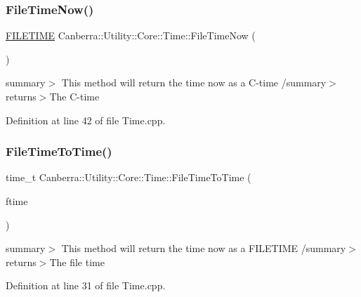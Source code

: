 \subsubsection{\texorpdfstring{File\+Time\+Now()}{FileTimeNow()}}
{\footnotesize\ttfamily \hyperlink{struct___f_i_l_e_t_i_m_e}{F\+I\+L\+E\+T\+I\+ME} Canberra\+::\+Utility\+::\+Core\+::\+Time\+::\+File\+Time\+Now (\begin{DoxyParamCaption}{ }\end{DoxyParamCaption})\hspace{0.3cm}{\ttfamily [static]}}

summary$>$ This method will return the time now as a C-\/time /summary$>$ returns$>$The C-\/time

Definition at line 42 of file Time.\+cpp.

\mbox{\label{class_canberra_1_1_utility_1_1_core_1_1_time_a5d4ac0089f3037decf175287aa256cce_a5d4ac0089f3037decf175287aa256cce}} 
\subsubsection{\texorpdfstring{File\+Time\+To\+Time()}{FileTimeToTime()}}
{\footnotesize\ttfamily time\+\_\+t Canberra\+::\+Utility\+::\+Core\+::\+Time\+::\+File\+Time\+To\+Time (\begin{DoxyParamCaption}\item[{const \hyperlink{struct___f_i_l_e_t_i_m_e}{F\+I\+L\+E\+T\+I\+ME} \&}]{ftime }\end{DoxyParamCaption})\hspace{0.3cm}{\ttfamily [static]}}

summary$>$ This method will return the time now as a F\+I\+L\+E\+T\+I\+ME /summary$>$ returns$>$The file time

Definition at line 31 of file Time.\+cpp.

\mbox{\label{class_canberra_1_1_utility_1_1_core_1_1_time_aaf783c2dc41f7380e8e7cd5b19b732f8_aaf783c2dc41f7380e8e7cd5b19b732f8}} 
